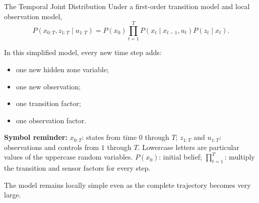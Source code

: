 \documentclass[aspectratio=169,10pt]{beamer}
\newcommand{\equationlegend}[1]{%
  \par\smallskip
  \begingroup
    \setlength{\fboxsep}{5pt}%
    \noindent\colorbox{DeckSoft}{%
      \parbox{\dimexpr\linewidth-2\fboxsep\relax}{%
        \footnotesize\textbf{Symbol reminder:} #1%
      }%
    }\par
  \endgroup
  \smallskip
}
\begin{document}
\begin{frame}[shrink=10]{The Temporal Joint Distribution}
  Under a first-order transition model and local observation model,
  \[
    P(x_{0:T},z_{1:T}\mid u_{1:T})
    =P(x_0)\prod_{t=1}^{T}
      P(x_t\mid x_{t-1},u_t)P(z_t\mid x_t).
  \]

  In this simplified model, every new time step adds:
  \begin{itemize}
    \item one new hidden zone variable;
    \item one new observation;
    \item one transition factor;
    \item one observation factor.
  \end{itemize}

  \equationlegend{$x_{0:T}$: states from time $0$ through $T$; $z_{1:T}$ and $u_{1:T}$: observations and controls from $1$ through $T$. Lowercase letters are particular values of the uppercase random variables. $P(x_0)$: initial belief; $\prod_{t=1}^{T}$: multiply the transition and sensor factors for every step.}

  \begin{keyidea}
    The model remains locally simple even as the complete trajectory becomes very large.
  \end{keyidea}
\end{frame}
\end{document}
